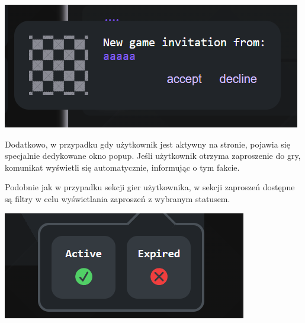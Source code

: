 \documentclass[twoside]{projektInzynierskiMS1}
\begin{document}
\noindent
\begin{minipage}[t]{0.45\textwidth} 
    \vspace{0pt} 
    \centering 
    \includegraphics[width=\linewidth]{images/ins_min_inv_popup.png}
\end{minipage} 
\hfill 
\begin{minipage}[t]{0.45\textwidth} 
    \vspace{0pt} 
    \justifying 
    \noindent 
    Dodatkowo, w przypadku gdy użytkownik jest aktywny na stronie, pojawia się specjalnie dedykowane okno popup. Jeśli użytkownik otrzyma zaproszenie do gry, komunikat wyświetli się automatycznie, informując o tym fakcie.
\end{minipage}

\vspace{1cm}

\noindent
\begin{minipage}[t]{0.45\textwidth} 
    \vspace{0pt} 
    \justifying 
    \noindent 
    Podobnie jak w przypadku sekcji gier użytkownika, w sekcji zaproszeń dostępne są filtry w celu wyświetlania zaproszeń z wybranym statusem.
\end{minipage} 
\hfill 
\begin{minipage}[t]{0.45\textwidth} 
    \vspace{0pt} 
    \centering 
    \includegraphics[width=\linewidth]{images/ins_filters.png}
\end{minipage} 
\end{document}
